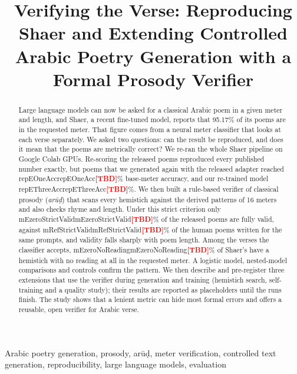 \documentclass[conference]{IEEEtran}
\newcommand{\pending}[1]{\textcolor{red}{\textbf{[#1]}}}
\newcommand{\TBD}{\pending{TBD}}
\newcommand{\val}[1]{\ifcsname #1\endcsname\csname #1\endcsname\else\TBD\fi}
\begin{document}
\title{Verifying the Verse: Reproducing Shaer and Extending Controlled Arabic Poetry Generation with a Formal Prosody Verifier}

\author{
\IEEEauthorblockA{\pending{Department, University}\\
\pending{City, Country}\\
\pending{email}}}

\maketitle

\begin{abstract}
Large language models can now be asked for a classical Arabic poem in a given meter and length, and Shaer, a recent
fine-tuned model, reports that 95.17\% of its poems are in the requested meter. That figure comes from a neural meter
classifier that looks at each verse separately. We asked two questions: can the result be reproduced, and does it mean
that the poems are metrically correct? We re-ran the whole Shaer pipeline on Google Colab GPUs. Re-scoring the released
poems reproduced every published number exactly, but poems that we generated again with the released adapter reached
\val{repEOneAcc}\% base-meter accuracy, and our re-trained model \val{repEThreeAcc}\%. We then built a rule-based verifier of
classical prosody (\emph{\textquotesingle ar\=u\d{d}}) that scans every hemistich against the derived patterns of 16 meters
and also checks rhyme and length. Under this strict criterion only \val{mEzeroStrictValid}\% of the released poems are
fully valid, against \val{mRefStrictValid}\% of the human poems written for the same prompts, and validity falls sharply
with poem length. Among the verses the classifier accepts, \val{mEzeroNoReading}\% of Shaer's have a hemistich with no
reading at all in the requested meter. A logistic model, nested-model comparisons and controls confirm the pattern. We
then describe and pre-register three extensions that use the verifier during generation and training (hemistich search,
self-training and a quality study); their results are reported as placeholders until the runs finish. The study shows
that a lenient metric can hide most formal errors and offers a reusable, open verifier for Arabic verse.
\end{abstract}

\begin{IEEEkeywords}
Arabic poetry generation, prosody, \textquotesingle ar\=u\d{d}, meter verification, controlled text generation,
reproducibility, large language models, evaluation
\end{IEEEkeywords}
















\appendices

\end{document}
